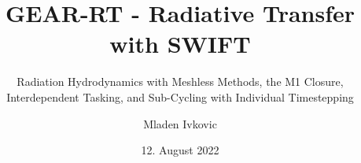 


\usepackage{pgfpages}






\title[GEAR-RT]{GEAR-RT - Radiative Transfer with SWIFT}
\subtitle[]{Radiation Hydrodynamics with Meshless Methods, the M1 Closure, Interdependent Tasking, and Sub-Cycling with Individual Timestepping}
\author[M. Ivkovic]{Mladen Ivkovic}




\date[12.08.2022]{12. August 2022}














\begin{frame}{}
	\titlepage
\end{frame}


